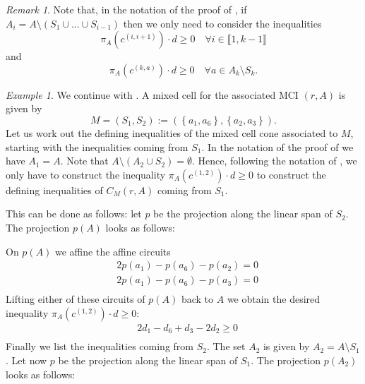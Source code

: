 \documentclass[a4paper]{article}
\theoremstyle{remark}
\newtheorem{remark}{Remark}
\newtheorem{example}{Example}
\newcommand{\set}[1]{\left\{#1\right\}}
\newcommand{\irng}[1]{\llbracket #1 \rrbracket}
\begin{document}
\begin{remark}
  Note that, in the notation of the proof of , if
  $A_i=A\setminus (S_1\cup \hdots \cup S_{i-1})$ then we only need to consider the inequalities
  \[\pi_A(c^{(i,i+1)})\cdot d \geq 0 \quad \forall i\in \irng{1,k-1}\]
  and
  \[\pi_A(c^{(k,a)})\cdot d \geq 0 \quad \forall a \in A_k\setminus S_k.\]
\end{remark}

\begin{example}
  \label{ex:hexagonineqs}
  We continue with . A mixed cell for the associated
  MCI $(r,A)$ is given by
  \[M = (S_1,S_2) := (\set{a_1,a_6},\set{a_2,a_3}).\] Let us work out
  the defining inequalities of the mixed cell cone associated to $M$,
  starting with the inequalities coming from $S_1$. In the notation of
  the proof of  we have $A_1 = A$.  Note that
  $A\setminus (A_2\cup S_2) = \emptyset$. Hence, following the notation of
  , we only have to construct the inequality
  $\pi_A(c^{(1,2)})\cdot d \geq 0$ to construct the defining inequalities of
  $C_M(r,A)$ coming from $S_1$.

  This can be done as follows: let $p$ be the
  projection along the linear span of $S_2$. The projection $p(A)$
  looks as follows:
  \begin{center}
  \end{center}
  On $p(A)$ we affine the affine circuits
  \begin{align*}
    & 2p(a_1) - p(a_6) - p(a_2) = 0\\
    & 2p(a_1) - p(a_6) - p(a_3) = 0\\
  \end{align*}
  Lifting either of these circuits of $p(A)$ back to $A$ we obtain the desired
  inequality $\pi_A(c^{(1,2)})\cdot d \geq 0$:
  \begin{equation}
    \label{eq:ineqs1}
    \begin{aligned}
      &2d_1-d_6+d_3-2d_2 \geq 0\\
    \end{aligned}
  \end{equation}
  Finally we list the inequalities coming from $S_2$. The set $A_2$ is
  given by $A_2 = A\setminus S_1$.  Let now $p$ be the projection along the
  linear span of $S_1$. The projection $p(A_2)$ looks as follows:
  \begin{center}
\end{center}
\end{example}
\end{document}
